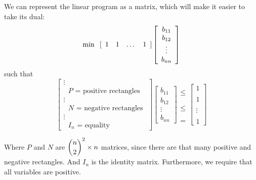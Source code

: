 \documentclass[11pt]{article}
\begin{document}
We can represent the linear program as a matrix, which will make it easier to take its dual:
\[ \min \hspace{.1in} [ \begin{array}{cccc} 1 & 1 & \dots & 1 \end{array} ] \left[\begin{array}{c} b_{11} \\ b_{12} \\ \vdots \\ b_{nn} \end{array} \right]\]
such that
\[ \left[ \begin{array}{c} \vdots \\ \text{ $P$ = positive rectangles } \\ \vdots \\ \text{ $N$ = negative rectangles } \\ \vdots \\ \text{ $I_n$ = equality } \end{array} \right] 
\left[\begin{array}{c} b_{11} \\ b_{12} \\ \vdots \\ b_{nn} \end{array} \right] 
\begin{array}{c} \\ \leq \\ \\ \\ \leq \\ \\ \\ = \end{array} 
\left[\begin{array}{c} 1 \\\\ 1 \\\\ \vdots \\\\ 1 \end{array} \right] \]

Where $P$ and $N$ are $\dbinom{n}{2}^2 \times n$ matrices, since there are that many positive and negative rectangles. And $I_n$ is the identity matrix. Furthermore, we require that all variables are positive. 
\end{document}
